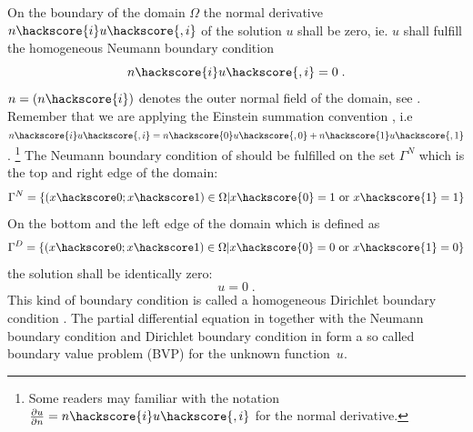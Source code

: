 On the boundary of the domain $\Omega$ the normal derivative $n\hackscore{i} u\hackscore{,i}$
of the solution $u$ shall be zero, ie. $u$ shall fulfill
the homogeneous Neumann boundary condition
\begin{equation}
n\hackscore{i} u\hackscore{,i}= 0 \;.
\label{eq:FirstSteps.2}
\end{equation}
$n=(n\hackscore{i})$ denotes the outer normal field
of the domain, see . Remember that we 
are applying the Einstein summation convention , i.e
$n\hackscore{i} u\hackscore{,i}= n\hackscore{0} u\hackscore{,0} +
n\hackscore{1} u\hackscore{,1}$. 
\footnote{Some readers may familiar with the notation
$
\frac{\partial u}{\partial n} = n\hackscore{i} u\hackscore{,i}
$
for the normal derivative.}
The Neumann boundary condition of  should be fulfilled on the
set $\Gamma^N$ which is the top and right edge of the domain:
\begin{equation}
\Gamma^N=\{(x\hackscore 0;x\hackscore 1) \in \Omega | x\hackscore{0}=1 \mbox{ or } x\hackscore{1}=1  \}
\label{eq:FirstSteps.2b}
\end{equation}
On the bottom and the left edge of the domain which is defined
as 
\begin{equation}
\Gamma^D=\{(x\hackscore 0;x\hackscore 1) \in \Omega | x\hackscore{0}=0 \mbox{ or } x\hackscore{1}=0  \}
\label{eq:FirstSteps.2c}
\end{equation}
the solution shall be identically zero:
\begin{equation}
u=0 \; .
\label{eq:FirstSteps.2d}
\end{equation}
This kind of boundary condition is called a homogeneous Dirichlet boundary condition
. The partial differential equation in  together
with the Neumann boundary condition  and 
Dirichlet boundary condition in  form a so
called boundary value
problem (BVP) for 
the unknown function~$u$. 


